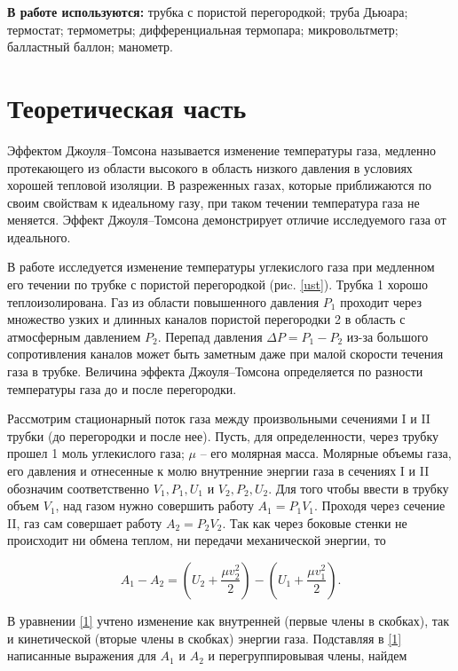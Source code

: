 \documentclass[a4paper,12pt]{article} %
\begin{document}
\textbf{В работе используются:} трубка с пористой перегородкой; труба Дьюара; термостат; термометры; дифференциальная термопара; микровольтметр; балластный баллон; манометр.
\section{Теоретическая часть}

Эффектом Джоуля–Томсона называется изменение температуры газа, медленно протекающего из области высокого в область низкого давления в условиях хорошей тепловой изоляции. В разреженных газах, которые приближаются по своим свойствам к идеальному газу, при таком течении температура газа не меняется. Эффект Джоуля–Томсона демонстрирует отличие исследуемого газа от идеального.

В работе исследуется изменение температуры углекислого газа при медленном его течении по трубке с пористой перегородкой (риc. \ref{ust}). Трубка 1 хорошо теплоизолирована. Газ из области повышенного давления $ P_1 $ проходит через множество узких и длинных каналов пористой перегородки 2 в область с атмосферным давлением $ P_2 $. Перепад давления $ \Delta P = P_1 - P_2 $ из-за большого сопротивления каналов может быть заметным даже при малой скорости течения газа в трубке. Величина эффекта Джоуля–Томсона определяется по разности температуры газа до и после перегородки.

Рассмотрим стационарный поток газа между произвольными сечениями I и II трубки (до перегородки и после нее). Пусть, для определенности, через трубку прошел 1 моль углекислого газа; $ \mu $ -- его молярная масса. Молярные объемы газа, его давления и отнесенные к молю внутренние энергии газа в сечениях I и II обозначим соответственно $ V_1, P_1, U_1 $ и $ V_2, P_2, U_2 $. Для того чтобы ввести в трубку объем $ V_1 $, над газом нужно совершить работу $ A_1 = P_1V_1 $. Проходя через сечение II, газ сам совершает работу $ A_2 = P_2V_2 $. Так как через боковые стенки не происходит ни обмена теплом, ни передачи механической энергии, то

\begin{equation}\label{1}
A_1-A_2=\left(U_2+\frac{\mu v_2^2}{2}\right) - \left(U_1 + \frac{\mu v_1^2}{2}\right).
\end{equation}

В уравнении \eqref{1} учтено изменение как внутренней (первые члены в скобках), так и кинетической (вторые члены в скобках) энергии газа. Подставляя в \eqref{1} написанные выражения для $ A_1 $ и $ A_2 $ и перегруппировывая члены, найдем
\end{document}
